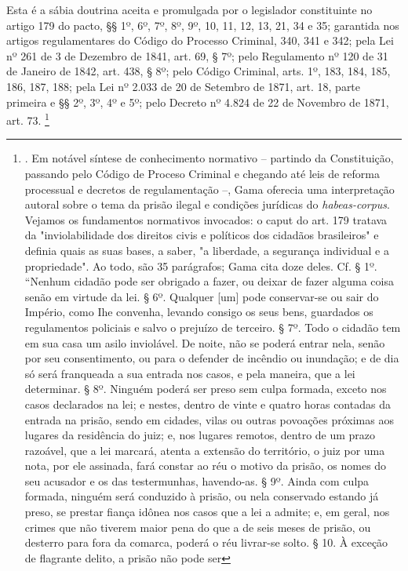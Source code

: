 Esta é a sábia doutrina aceita e promulgada por o legislador
constituinte no artigo 179 do pacto, §§ 1º, 6º, 7º, 8º, 9º, 10, 11, 12,
13, 21, 34 e 35; garantida nos artigos regulamentares do Código do
Processo Criminal, 340, 341 e 342; pela Lei nº 261 de 3 de Dezembro de
1841, art. 69, § 7º; pelo Regulamento nº 120 de 31 de Janeiro de 1842,
art. 438, § 8º; pelo Código Criminal, arts. 1º, 183, 184, 185, 186, 187,
188; pela Lei nº 2.033 de 20 de Setembro de 1871, art. 18, parte
primeira e §§ 2º, 3º, 4º e 5º; pelo Decreto nº 4.824 de 22 de Novembro
de 1871, art. 73. \footnote{. Em notável síntese de conhecimento
  normativo -- partindo da Constituição, passando pelo Código de Proceso
  Criminal e chegando até leis de reforma processual e decretos de
  regulamentação --, Gama oferecia uma interpretação autoral sobre o
  tema da prisão ilegal e condições jurídicas do \emph{habeas-corpus}.
  Vejamos os fundamentos normativos invocados: o caput do art. 179
  tratava da "inviolabilidade dos direitos civis e políticos dos
  cidadãos brasileiros" e definia quais as suas bases, a saber, "a
  liberdade, a segurança individual e a propriedade". Ao todo, são 35
  parágrafos; Gama cita doze deles. Cf. § 1º. ``Nenhum cidadão pode ser
  obrigado a fazer, ou deixar de fazer alguma coisa senão em virtude da
  lei. § 6º. Qualquer {[}um{]} pode conservar-se ou sair do Império,
  como Ihe convenha, levando consigo os seus bens, guardados os
  regulamentos policiais e salvo o prejuízo de terceiro. § 7º. Todo o
  cidadão tem em sua casa um asilo inviolável. De noite, não se poderá
  entrar nela, senão por seu consentimento, ou para o defender de
  incêndio ou inundação; e de dia só será franqueada a sua entrada nos
  casos, e pela maneira, que a lei determinar. § 8º. Ninguém poderá ser
  preso sem culpa formada, exceto nos casos declarados na lei; e nestes,
  dentro de vinte e quatro horas contadas da entrada na prisão, sendo em
  cidades, vilas ou outras povoações próximas aos lugares da residência
  do juiz; e, nos lugares remotos, dentro de um prazo razoável, que a
  lei marcará, atenta a extensão do território, o juiz por uma nota, por
  ele assinada, fará constar ao réu o motivo da prisão, os nomes do seu
  acusador e os das testermunhas, havendo-as. § 9º. Ainda com culpa
  formada, ninguém será conduzido à prisão, ou nela conservado estando
  já preso, se prestar fiança idônea nos casos que a lei a admite; e, em
  geral, nos crimes que não tiverem maior pena do que a de seis meses de
  prisão, ou desterro para fora da comarca, poderá o réu livrar-se
  solto. § 10. À exceção de flagrante delito, a prisão não pode ser
}
